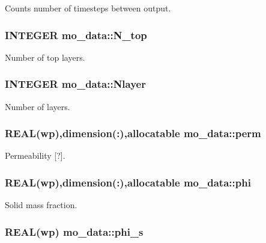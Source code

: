 Counts number of timesteps between output. 

\hypertarget{namespacemo__data_a4be9ef8c44dfc2c8fccc353a2fc5fc79}{
\subsubsection[{N\_\-top}]{\setlength{\rightskip}{0pt plus 5cm}INTEGER {\bf mo\_\-data::N\_\-top}}}
\label{namespacemo__data_a4be9ef8c44dfc2c8fccc353a2fc5fc79}


Number of top layers. 

\hypertarget{namespacemo__data_ab0b091ff23970ff2939892c9d8f788f1}{
\subsubsection[{Nlayer}]{\setlength{\rightskip}{0pt plus 5cm}INTEGER {\bf mo\_\-data::Nlayer}}}
\label{namespacemo__data_ab0b091ff23970ff2939892c9d8f788f1}


Number of layers. 

\hypertarget{namespacemo__data_ac629f6eccf4b77df3406ac2ad5ac8ea6}{
\subsubsection[{perm}]{\setlength{\rightskip}{0pt plus 5cm}REAL(wp),dimension(:),allocatable {\bf mo\_\-data::perm}}}
\label{namespacemo__data_ac629f6eccf4b77df3406ac2ad5ac8ea6}


Permeability \mbox{[}?\mbox{]}. 

\hypertarget{namespacemo__data_ace165f21c4edcf77372b13a99161aec8}{
\subsubsection[{phi}]{\setlength{\rightskip}{0pt plus 5cm}REAL(wp),dimension(:),allocatable {\bf mo\_\-data::phi}}}
\label{namespacemo__data_ace165f21c4edcf77372b13a99161aec8}


Solid mass fraction. 

\hypertarget{namespacemo__data_aee41245a2d1d08be740021dfc14cf723}{
\subsubsection[{phi\_\-s}]{\setlength{\rightskip}{0pt plus 5cm}REAL(wp) {\bf mo\_\-data::phi\_\-s}}}
\label{namespacemo__data_aee41245a2d1d08be740021dfc14cf723}


